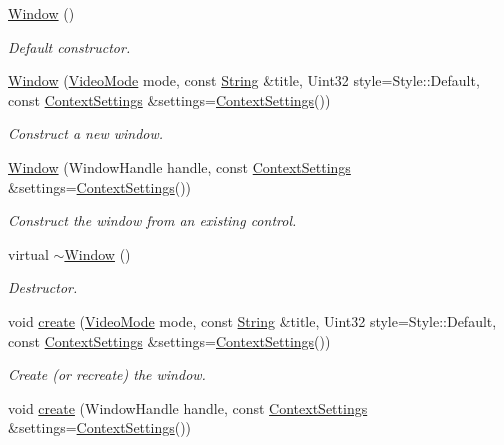 \begin{DoxyCompactItemize}
\item 
\hyperlink{classsf_1_1_window_a5359122166b4dc492c3d25caf08ccfc4}{Window} ()
\begin{DoxyCompactList}\small\item\em Default constructor. \end{DoxyCompactList}\item 
\hyperlink{classsf_1_1_window_a1bee771baecbae6d357871929dc042a2}{Window} (\hyperlink{classsf_1_1_video_mode}{Video\+Mode} mode, const \hyperlink{classsf_1_1_string}{String} \&title, Uint32 style=Style\+::\+Default, const \hyperlink{structsf_1_1_context_settings}{Context\+Settings} \&settings=\hyperlink{structsf_1_1_context_settings}{Context\+Settings}())
\begin{DoxyCompactList}\small\item\em Construct a new window. \end{DoxyCompactList}\item 
\hyperlink{classsf_1_1_window_a6d60912633bff9d33cf3ade4e0201de4}{Window} (Window\+Handle handle, const \hyperlink{structsf_1_1_context_settings}{Context\+Settings} \&settings=\hyperlink{structsf_1_1_context_settings}{Context\+Settings}())
\begin{DoxyCompactList}\small\item\em Construct the window from an existing control. \end{DoxyCompactList}\item 
virtual \hyperlink{classsf_1_1_window_ac30eb6ea5f5594204944d09d4bd69a97}{$\sim$\+Window} ()
\begin{DoxyCompactList}\small\item\em Destructor. \end{DoxyCompactList}\item 
void \hyperlink{classsf_1_1_window_a30e6edf2162f8dbff61023b9de5d961d}{create} (\hyperlink{classsf_1_1_video_mode}{Video\+Mode} mode, const \hyperlink{classsf_1_1_string}{String} \&title, Uint32 style=Style\+::\+Default, const \hyperlink{structsf_1_1_context_settings}{Context\+Settings} \&settings=\hyperlink{structsf_1_1_context_settings}{Context\+Settings}())
\begin{DoxyCompactList}\small\item\em Create (or recreate) the window. \end{DoxyCompactList}\item 
void \hyperlink{classsf_1_1_window_acf67483dc21f08d65c8835b3889b41b2}{create} (Window\+Handle handle, const \hyperlink{structsf_1_1_context_settings}{Context\+Settings} \&settings=\hyperlink{structsf_1_1_context_settings}{Context\+Settings}())

\end{DoxyCompactItemize}
